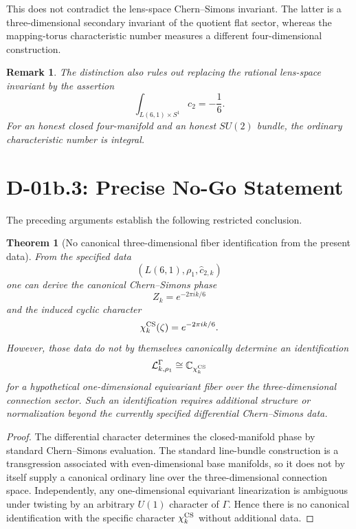 \documentclass[11pt,a4paper]{article}
\newtheorem{theorem}[definition]{Theorem}
\newtheorem{remark}[definition]{Remark}
\begin{document}
This does not contradict the lens-space Chern--Simons invariant. The latter is a three-dimensional secondary invariant of the quotient flat sector, whereas the mapping-torus characteristic number measures a different four-dimensional construction.

\begin{remark}
The distinction also rules out replacing the rational lens-space invariant by the assertion
\begin{equation}
\int_{L(6,1)\times S^1}c_2=-\frac16.
\end{equation}
For an honest closed four-manifold and an honest $SU(2)$ bundle, the ordinary characteristic number is integral.
\end{remark}

\section{D-01b.3: Precise No-Go Statement}

The preceding arguments establish the following restricted conclusion.

\begin{theorem}[No canonical three-dimensional fiber identification from the present data]
From the specified data
\begin{equation}
\left(L(6,1),\rho_1,\widehat c_{2,k}\right)
\end{equation}
one can derive the canonical Chern--Simons phase
\begin{equation}
Z_k=e^{-2\pi i k/6}
\end{equation}
and the induced cyclic character
\begin{equation}
\chi_k^{\rm CS}(\zeta)=e^{-2\pi i k/6}.
\end{equation}
However, those data do not by themselves canonically determine an identification
\begin{equation}
\mathcal L_{k,\rho_1}^{\Gamma}
\cong
\mathbb C_{\chi_k^{\rm CS}}
\end{equation}
for a hypothetical one-dimensional equivariant fiber over the three-dimensional connection sector. Such an identification requires additional structure or normalization beyond the currently specified differential Chern--Simons data.
\end{theorem}

\begin{proof}
The differential character determines the closed-manifold phase by standard Chern--Simons evaluation. The standard line-bundle construction is a transgression associated with even-dimensional base manifolds, so it does not by itself supply a canonical ordinary line over the three-dimensional connection space. Independently, any one-dimensional equivariant linearization is ambiguous under twisting by an arbitrary $U(1)$ character of $\Gamma$. Hence there is no canonical identification with the specific character $\chi_k^{\rm CS}$ without additional data.
\end{proof}
\end{document}
